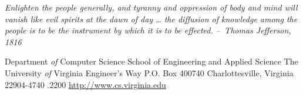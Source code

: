 \documentclass[10pt,letter,twocolumn]{book}
\begin{document}
\cleardoublepage
\pagestyle{empty}

\begin{figure*}
\begin{center}
\parbox{2.5in}{{\em Enlighten the people generally, and tyranny and
    oppression of body and mind will vanish like evil spirits at the
    dawn of day … the diffusion of knowledge among the people is to be
    the instrument by which it is to be effected.\linebreak\linebreak
    --~Thomas Jefferson, 1816}}
\end{center}
\end{figure*}

\clearpage

\begin{figure*}
\begin{center}
Department {\em of} Computer Science \linebreak
School of Engineering and Applied Science \linebreak
The University {\em of} Virginia  Engineer's Way \linebreak
P.O. Box 400740 \linebreak
Charlottesville, Virginia 22904-4740 .2200 \linebreak
\url{http://www.cs.virginia.edu} \linebreak
\end{center}

\begin{center}
\end{center}
\end{figure*}
\end{document}
